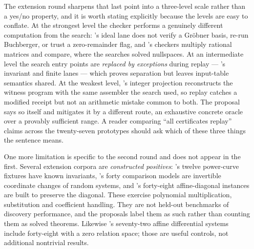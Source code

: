 The extension round sharpens that last point into a three-level scale rather
than a yes/no property, and it is worth stating explicitly because the levels
are easy to conflate. At the strongest level the checker performs a genuinely
different computation from the search: 's ideal lane does not verify a
Gr\"obner basis, re-run Buchberger, or trust a zero-remainder flag, and
's checkers multiply rational matrices and compare, where the searches
solved nullspaces. At an intermediate level the search entry points are
\emph{replaced by exceptions} during replay --- 's invariant and finite
lanes --- which proves separation but leaves input-table semantics shared. At
the weakest level, 's integer projection reconstructs the witness
program with the same assembler the search used, so replay catches a modified
receipt but not an arithmetic mistake common to both. The proposal says so
itself and mitigates it by a different route, an exhaustive concrete oracle over
a provably sufficient range. A reader comparing ``all certificates replay''
claims across the twenty-seven prototypes should ask which of these three things
the sentence means.

One more limitation is specific to the second round and does not appear in the
first. Several extension corpora are \emph{constructed positives}: 's
twelve power-curve fixtures have known invariants, 's forty comparison
models are invertible coordinate changes of random systems, and 's
forty-eight affine-diagonal instances are built to preserve the diagonal. These
exercise polynomial multiplication, substitution and coefficient handling. They
are not held-out benchmarks of discovery performance, and the proposals label
them as such rather than counting them as solved theorems. Likewise 's
seventy-two affine differential systems include forty-eight with a zero relation
space; those are useful controls, not additional nontrivial results.
